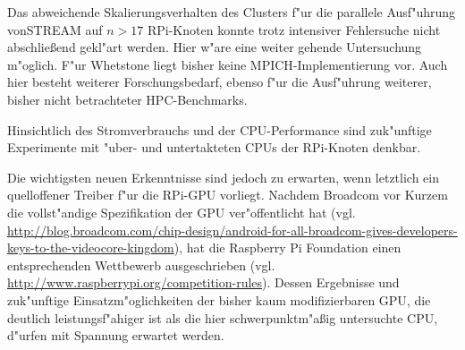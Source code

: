 Das abweichende Skalierungsverhalten des Clusters f"ur die parallele Ausf"uhrung von\newline STREAM auf $n>17$ RPi-Knoten konnte trotz intensiver Fehlersuche nicht abschlie\ss end gekl"art werden. Hier w"are eine weiter gehende Untersuchung m"oglich. F"ur Whetstone liegt bisher keine MPICH-Implementierung vor. Auch hier besteht weiterer Forschungsbedarf, ebenso f"ur die Ausf"uhrung weiterer, bisher nicht betrachteter HPC-Benchmarks. 

Hinsichtlich des Stromverbrauchs und der CPU-Performance sind zuk"unftige Experimente mit "uber- und untertakteten CPUs der RPi-Knoten denkbar. 

Die wichtigsten neuen Erkenntnisse sind jedoch zu erwarten, wenn letztlich ein quelloffener Treiber f"ur die RPi-GPU vorliegt. Nachdem Broadcom vor Kurzem die vollst"andige Spezifikation der GPU ver"offentlicht hat (vgl. \url{http://blog.broadcom.com/chip-design/android-for-all-broadcom-gives-developers-keys-to-the-videocore-kingdom}), hat die Raspberry Pi Foundation einen entsprechenden Wettbewerb ausgeschrieben (vgl. \url{http://www.raspberrypi.org/competition-rules}). Dessen Ergebnisse und zuk"unftige Einsatz\-m"oglichkeiten der bisher kaum modifizierbaren GPU, die deutlich leistungsf"ahiger ist als die hier schwerpunktm"a\ss ig untersuchte CPU, d"urfen mit Spannung erwartet werden. 
\endinput